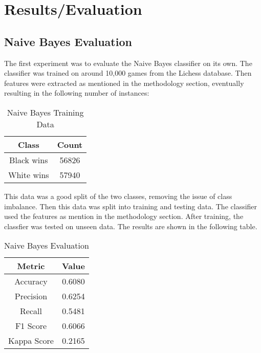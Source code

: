 \pgfplotsset{compat=1.17} %


\chapter{Results/Evaluation}


\section{Naive Bayes Evaluation}

The first experiment was to evaluate the Naive Bayes classifier on its own. The classifier was trained on around 10,000 games from the Lichess database. Then features were extracted as mentioned in the methodology section, eventually resulting in the following number of instances:

\begin{table}[H]
    \centering
    \begin{tabular}{|c|c|}
    \hline
    \textbf{Class} & \textbf{Count}  \\ \hline
    Black wins             & 56826           \\ \hline
    White wins              & 57940           \\ \hline
    \end{tabular}
    \caption{Naive Bayes Training Data}
    \label{tab:naive_bayes_training_data}
\end{table}




This data was a good split of the two classes, removing the issue of class imbalance. Then this data was split into training and testing data.
 The classifier used the features as mention in the methodology section. After training, the classfier was tested on unseen data. The results are shown in the following table.


\begin{table}[H]
    \centering
    \begin{tabular}{|c|c|}
    \hline
    \textbf{Metric} & \textbf{Value}  \\ \hline
    Accuracy        & 0.6080           \\ \hline
    Precision       & 0.6254           \\ \hline
    Recall          & 0.5481           \\ \hline
    F1 Score        & 0.6066           \\ \hline
    Kappa Score     & 0.2165           \\ \hline
    \end{tabular}
    \caption{Naive Bayes Evaluation}
    \label{tab:naive_bayes_evaluation}
\end{table}

